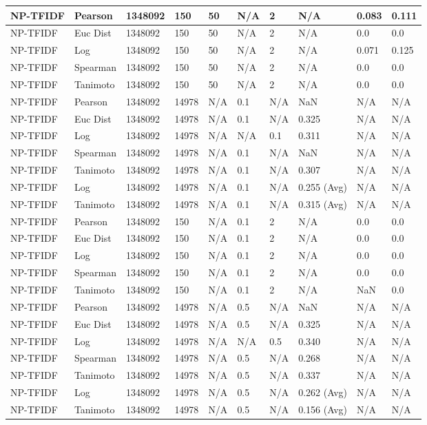\documentclass{article}
\begin{document}
\begin{longtable}{ |p{1.7cm}|p{1.9cm}|p{1.5cm}|p{1.5cm}|p{0.75cm}|p{0.75cm}|p{0.75cm}|p{0.75cm}|p{1.5cm}|p{1.5cm}|}
    NP-TFIDF  & Pearson & 1348092 & 150 & 50 & N/A  & 2 & N/A & 0.083 & 0.111  \\ \hline
    NP-TFIDF  & Euc Dist & 1348092 & 150 & 50 & N/A  & 2 & N/A &0.0 & 0.0   \\ \hline
    NP-TFIDF  & Log & 1348092 & 150 & 50 & N/A & 2 & N/A & 0.071 & 0.125  \\ \hline
    NP-TFIDF  & Spearman & 1348092 & 150 & 50 & N/A  & 2 & N/A &0.0 & 0.0 \\ \hline
    NP-TFIDF  & Tanimoto & 1348092 & 150 & 50 & N/A  & 2 & N/A & 0.0 & 0.0 \\ \hline
    
    NP-TFIDF & Pearson & 1348092 & 14978 & N/A & 0.1 & N/A & NaN & N/A & N/A  \\ \hline
    NP-TFIDF  & Euc Dist & 1348092 & 14978 & N/A & 0.1 & N/A & 0.325 & N/A & N/A   \\ \hline
    NP-TFIDF  & Log & 1348092 & 14978 & N/A &  N/A & 0.1 & 0.311 & N/A & N/A  \\ \hline
    NP-TFIDF  & Spearman & 1348092 & 14978 & N/A & 0.1 & N/A & NaN & N/A & N/A \\ \hline
    NP-TFIDF  & Tanimoto & 1348092 & 14978 & N/A & 0.1 & N/A & 0.307 & N/A & N/A \\ \hline
    NP-TFIDF  & Log & 1348092 & 14978 & N/A & 0.1 & N/A & 0.255 (Avg) & N/A & N/A \\ \hline
    NP-TFIDF  & Tanimoto & 1348092 & 14978 & N/A & 0.1 & N/A & 0.315 (Avg) & N/A & N/A \\ \hline
    
    NP-TFIDF  & Pearson & 1348092 & 150 & N/A & 0.1 & 2 & N/A & 0.0 & 0.0  \\ \hline
    NP-TFIDF  & Euc Dist & 1348092 & 150 & N/A & 0.1 & 2 & N/A &0.0 & 0.0   \\ \hline
    NP-TFIDF  & Log & 1348092 & 150 & N/A & 0.1 & 2 & N/A & 0.0 & 0.0  \\ \hline
    NP-TFIDF  & Spearman & 1348092 & 150 & N/A & 0.1 & 2 & N/A &0.0 & 0.0 \\ \hline
    NP-TFIDF  & Tanimoto & 1348092 & 150 & N/A & 0.1 & 2 & N/A & NaN & 0.0 \\ \hline
    
    NP-TFIDF & Pearson & 1348092 & 14978 & N/A & 0.5 & N/A & NaN & N/A & N/A  \\ \hline
    NP-TFIDF  & Euc Dist & 1348092 & 14978 & N/A & 0.5 & N/A & 0.325 & N/A & N/A   \\ \hline
    NP-TFIDF  & Log & 1348092 & 14978 & N/A &  N/A & 0.5 & 0.340 & N/A & N/A  \\ \hline
    NP-TFIDF  & Spearman & 1348092 & 14978 & N/A & 0.5 & N/A & 0.268 & N/A & N/A \\ \hline
    NP-TFIDF  & Tanimoto & 1348092 & 14978 & N/A & 0.5 & N/A & 0.337 & N/A & N/A \\ \hline
    NP-TFIDF  & Log & 1348092 & 14978 & N/A & 0.5 & N/A & 0.262 (Avg) & N/A & N/A \\ \hline
    NP-TFIDF  & Tanimoto & 1348092 & 14978 & N/A & 0.5 & N/A & 0.156 (Avg) & N/A & N/A \\ \hline
    

\end{longtable}
\end{document}
